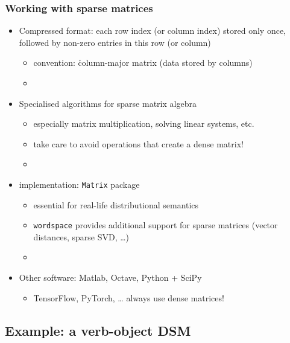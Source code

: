 \documentclass[t]{beamer} %
\begin{document}
\begin{frame}
  \frametitle{Working with sparse matrices}

  \begin{itemize}
  \item Compressed format: each row index (or column index) stored only once,
    followed by non-zero entries in this row (or column)%
    \begin{itemize}
    \item convention: \h{column-major} matrix (data stored by columns)
    \item[]
    \end{itemize}
  \item Specialised algorithms for sparse matrix algebra
    \begin{itemize}
    \item especially matrix multiplication, solving linear systems, etc.
    \item take care to avoid operations that create a dense matrix!
    \item[]
    \end{itemize}
  \item<2->  implementation: \texttt{Matrix} package
    \begin{itemize}
    \item essential for real-life distributional semantics
    \item \texttt{wordspace} provides additional support for sparse matrices (vector distances, sparse SVD, \ldots)
    \item[]
    \end{itemize}
  \item<2-> Other software: Matlab, Octave, Python + SciPy
	\begin{itemize}
    \item[\hand] TensorFlow, PyTorch, \ldots{} always use dense matrices!
	\end{itemize}
  \end{itemize}
\end{frame}

\subsection{Example: a verb-object DSM}
\end{document}
